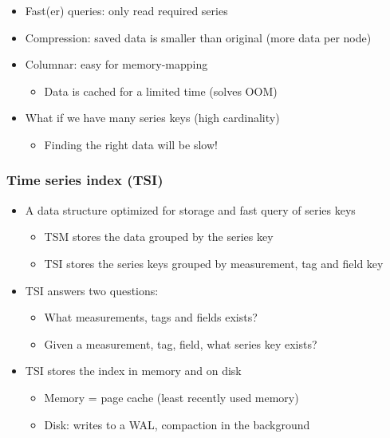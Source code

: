 \documentclass{article}
\begin{document}
\begin{itemize}
    \item Fast(er) queries: only read required series
    \item Compression: saved data is smaller than original (more data per node)
    \item Columnar: easy for memory-mapping
    \begin{itemize}
        \item Data is cached for a limited time (solves OOM)
    \end{itemize}
    \item What if we have many series keys (high cardinality)
    \begin{itemize}
        \item Finding the right data will be slow!
    \end{itemize}
\end{itemize}

\subsubsection{Time series index (TSI)}

\begin{itemize}
    \item A data structure optimized for storage and fast query of series keys
    \begin{itemize}
        \item TSM stores the data grouped by the series key
        \item TSI stores the series keys grouped by measurement, tag and field key
    \end{itemize}
    \item TSI answers two questions:
    \begin{itemize}
        \item What measurements, tags and fields exists?
        \item Given a measurement, tag, field, what series key exists?
    \end{itemize}
    \item TSI stores the index in memory and on disk
    \begin{itemize}
        \item Memory = page cache (least recently used memory)
        \item Disk: writes to a WAL, compaction in the background
    \end{itemize}
\end{itemize}
\end{document}
